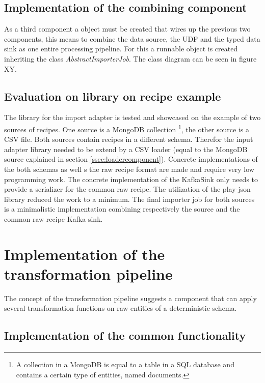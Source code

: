 \subsection{Implementation of the combining component}

As a third component a object must be created that wires up the previous two components, this means to combine the data source, the UDF and the typed data sink as one entire processing pipeline. For this a runnable object is created inheriting the class \textit{AbstractImporterJob}. The class diagram can be seen in figure XY.  

\subsection{Evaluation on library on recipe example}
The library for the import adapter is tested and showcased on the example of two sources of recipes. One source is a MongoDB collection \footnote{A collection in a MongoDB is equal to a table in a SQL database and contains a certain type of entities, named documents.}, the other source is a CSV file. Both sources contain recipes in a different schema. Therefor the input adapter library needed to be extend by a CSV loader (equal to the MongoDB source explained in section \ref{ssec:loadercomponent}). Concrete implementations of the both schemas as well s the raw recipe format are made and require very low programming work. The concrete implementation of the KafkaSink only needs to provide a serializer for the common raw recipe. The utilization of the play-json library reduced the work to a minimum. The final importer job for both sources is a minimalistic implementation combining respectively the source and the common raw recipe Kafka sink.

\section{Implementation of the transformation pipeline}

The concept of the transformation pipeline suggests a component that can apply several transformation functions on raw entities of a deterministic schema.

\subsection{Implementation of the common functionality}


